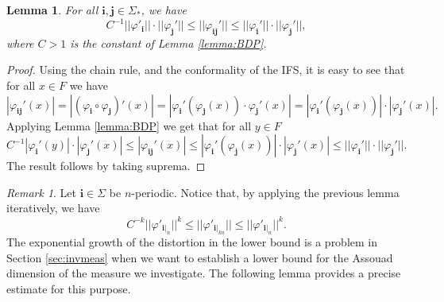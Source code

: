 \documentclass{PRM}
\theoremstyle{plain}
\newtheorem{lemma}[thm]{Lemma}
\theoremstyle{definition}
\theoremstyle{remark}
\newtheorem{huom}[thm]{Remark}
\begin{document}
\begin{lemma}\label{lemma:chain}
For all $\mathbf{i},\mathbf{j}\in\Sigma_*$, we have
\begin{equation*}
    C^{-1}||\varphi'_{\mathbf{i}}||\cdot||\varphi_{\mathbf{j}}'||\leq||\varphi_{\mathbf{i}\mathbf{j}}'||\leq ||\varphi_{\mathbf{i}}'||\cdot||\varphi_{\mathbf{j}}'||,
\end{equation*}
where $C>1$ is the constant of Lemma \ref{lemma:BDP}.
\end{lemma}
\begin{proof}
Using the chain rule, and the conformality of the IFS, it is easy to see that for all $x\in F$ we have
\begin{equation*}
    |\varphi_{\mathbf{i}\mathbf{j}}'(x)|= |(\varphi_{\mathbf{i}}\circ\varphi_{\mathbf{j}})'(x)|
    =|\varphi_{\mathbf{i}}'(\varphi_{\mathbf{j}}(x))\cdot\varphi_{\mathbf{j}}'(x)|=|\varphi_{\mathbf{i}}'(\varphi_{\mathbf{j}}(x))|\cdot|\varphi_{\mathbf{j}}'(x)|.
\end{equation*}
Applying Lemma \ref{lemma:BDP} we get that for all $y\in F$
\begin{equation*}
    C^{-1}|\varphi_{\mathbf{i}}'(y)|\cdot|\varphi_{\mathbf{j}}'(x)|\leq |\varphi_{\mathbf{i}\mathbf{j}}'(x)| \leq |\varphi_{\mathbf{i}}'(\varphi_{\mathbf{j}}(x))|\cdot|\varphi_{\mathbf{j}}'(x)|\leq ||\varphi_{\mathbf{i}}'||\cdot||\varphi_{\mathbf{j}}'||.
\end{equation*}
The result follows by taking suprema.
\end{proof}
\begin{huom}
Let $\mathbf{i}\in\Sigma$ be $n$-periodic. Notice that, by applying the previous lemma iteratively, we have
\begin{equation*}
    C^{-k}||\varphi'_{\mathbf{i}|_n}||^k\leq||\varphi'_{\mathbf{i}|_{kn}}||\leq ||\varphi'_{\mathbf{i}|_n}||^k.
\end{equation*}
The exponential growth of the distortion in the lower bound is a problem in Section \ref{sec:invmeas} when we want to establish a lower bound for the Assouad dimension of the measure we investigate. The following lemma provides a precise estimate for this purpose.
\end{huom}
\end{document}
